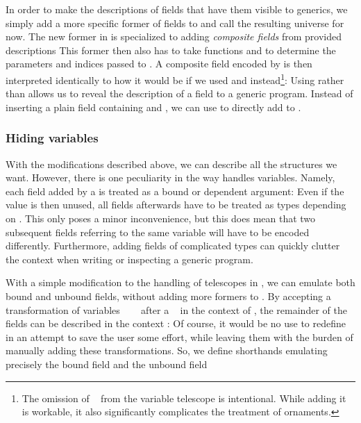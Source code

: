 In order to make the descriptions of fields that have them visible to generics, we simply add a more specific former of fields to  and call the resulting universe  for now. The new former  in  is specialized to adding \emph{composite fields} from provided descriptions
This former then also has to take functions  and  to determine the parameters and indices passed to . A composite field encoded by  is then interpreted identically to how it would be if we used  and  instead\footnote{The omission of \  from the variable telescope is intentional. While adding it is workable, it also significantly complicates the treatment of ornaments.}:
Using  rather than  allows us to reveal the description of a field to a generic program. Instead of inserting a plain field containing  and , we can use  to directly add  to .

\subsubsection{Hiding variables}
With the modifications described above, we can describe all the structures we want. However, there is one peculiarity in the way  handles variables. Namely, each field  added by a  is treated as a bound or dependent argument: Even if the value  is then unused, all fields afterwards have to be treated as types depending on . This only poses a minor inconvenience, but this does mean that two subsequent fields referring to the same variable will have to be encoded differently. Furthermore, adding fields of complicated types can quickly clutter the context when writing or inspecting a generic program.

With a simple modification to the handling of telescopes in , we can emulate both bound and unbound fields, without adding more formers to . By accepting a transformation of variables \ \ \  after a \  in the context of , the remainder of the fields can be described in the context :
Of course, it would be no use to redefine  in an attempt to save the user some effort, while leaving them with the burden of manually adding these transformations. So, we define shorthands emulating precisely the bound field
and the unbound field


